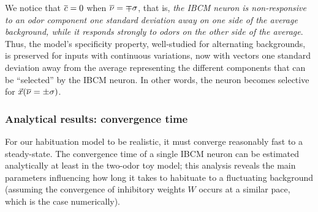 We notice that $\overline{c} = 0$ when $\overline{\nu} = \mp \sigma$, that is, \emph{the IBCM neuron is non-responsive to an odor component one standard deviation away on one side of the average background, while it responds strongly to odors on the other side of the average}. Thus, the model's specificity property, well-studied for alternating backgrounds, is preserved for inputs with continuous variations, now with vectors one standard deviation away from the average representing the different components that can be ``selected'' by the IBCM neuron. In other words, the neuron becomes selective for $\vec{x}(\overline{\nu} = \pm \sigma)$. 


\subsubsection{Analytical results: convergence time}
\label{subsubsect:convergence_time_2d}
For our habituation model to be realistic, it must converge reasonably fast to a steady-state. The convergence time of a single IBCM neuron can be estimated analytically at least in the two-odor toy model; this analysis reveals the main parameters influencing how long it takes to habituate to a fluctuating background (assuming the convergence of inhibitory weights $W$ occurs at a similar pace, which is the case numerically).

